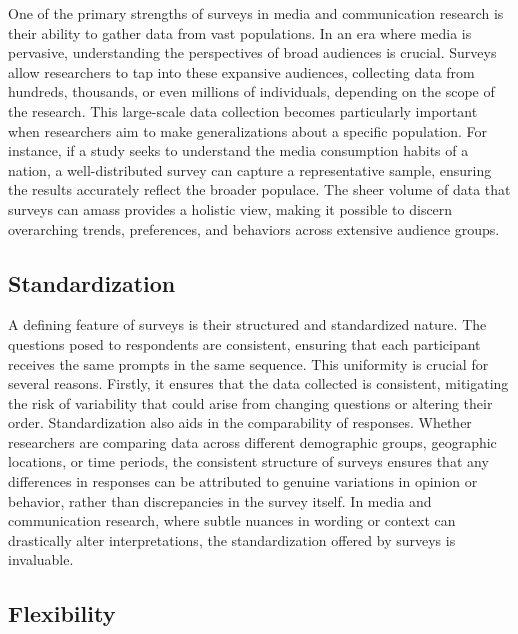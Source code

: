 \documentclass[
  b5paper]{book}
\begin{document}
One of the primary strengths of surveys in media and communication research is their ability to gather data from vast populations. In an era where media is pervasive, understanding the perspectives of broad audiences is crucial. Surveys allow researchers to tap into these expansive audiences, collecting data from hundreds, thousands, or even millions of individuals, depending on the scope of the research. This large-scale data collection becomes particularly important when researchers aim to make generalizations about a specific population. For instance, if a study seeks to understand the media consumption habits of a nation, a well-distributed survey can capture a representative sample, ensuring the results accurately reflect the broader populace. The sheer volume of data that surveys can amass provides a holistic view, making it possible to discern overarching trends, preferences, and behaviors across extensive audience groups.

\hypertarget{standardization}{%
\subsection*{Standardization}\label{standardization}}

A defining feature of surveys is their structured and standardized nature. The questions posed to respondents are consistent, ensuring that each participant receives the same prompts in the same sequence. This uniformity is crucial for several reasons. Firstly, it ensures that the data collected is consistent, mitigating the risk of variability that could arise from changing questions or altering their order. Standardization also aids in the comparability of responses. Whether researchers are comparing data across different demographic groups, geographic locations, or time periods, the consistent structure of surveys ensures that any differences in responses can be attributed to genuine variations in opinion or behavior, rather than discrepancies in the survey itself. In media and communication research, where subtle nuances in wording or context can drastically alter interpretations, the standardization offered by surveys is invaluable.

\hypertarget{flexibility}{%
\subsection*{Flexibility}\label{flexibility}}
\end{document}
